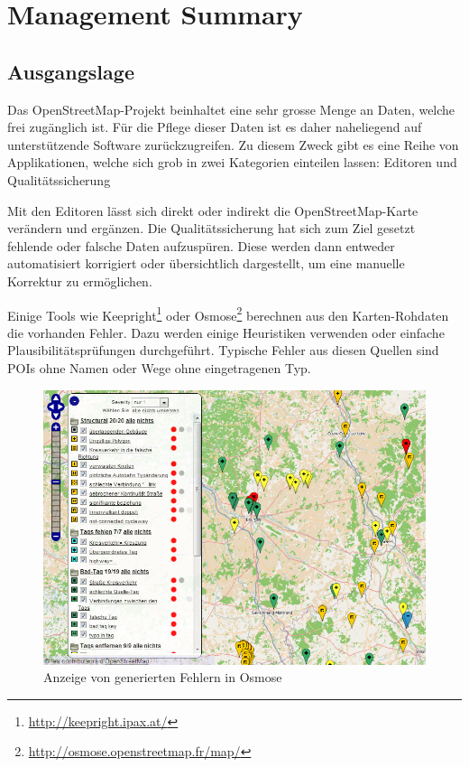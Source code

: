 \chapter*{Management Summary}
\thispagestyle{scrheadings}


\section*{Ausgangslage}
Das OpenStreetMap-Projekt beinhaltet eine sehr grosse Menge an Daten, welche frei zugänglich ist.
Für die Pflege dieser Daten ist es daher naheliegend auf unterstützende Software zurückzugreifen.
Zu diesem Zweck gibt es eine Reihe von Applikationen, welche sich grob in zwei Kategorien einteilen lassen:
Editoren und Qualitätssicherung

Mit den Editoren lässt sich direkt oder indirekt die OpenStreetMap-Karte verändern und ergänzen.
Die Qualitätssicherung hat sich zum Ziel gesetzt fehlende oder falsche Daten aufzuspüren.
Diese werden dann entweder automatisiert korrigiert oder übersichtlich dargestellt, um eine manuelle Korrektur zu ermöglichen.

Einige Tools wie Keepright\footnote{\url{http://keepright.ipax.at/}} oder Osmose\footnote{\url{http://osmose.openstreetmap.fr/map/}} berechnen aus den Karten-Rohdaten die vorhanden Fehler.
Dazu werden einige Heuristiken verwenden oder einfache Plausibilitätsprüfungen durchgeführt.
Typische Fehler aus diesen Quellen sind \gls{POI}s ohne Namen oder Wege ohne eingetragenen Typ.

\begin{figure}[H]
	\centering
	\includegraphics[scale=0.4]{images/managementsummary/osmose-screenshot}
	\caption{Anzeige von generierten Fehlern in Osmose}
	\label{image-osmose-screenshot}
\end{figure}

